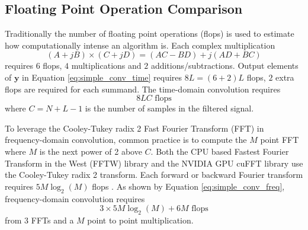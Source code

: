 \subsection{Floating Point Operation Comparison}
Traditionally the number of floating point operations (flops) is used to estimate how computationally intense an algorithm is. 
Each complex multiplication  
\begin{equation}
(A+jB)\times(C+jD) = (AC-BD)+j(AD+BC)
\end{equation}
requires $6$ flops, $4$ multiplications and $2$ additions/subtractions.
Output elements of $\mathbf{y}$ in Equation \eqref{eq:simple_conv_time} requires $8L = (6+2)L$ flops, $2$ extra flops are required for each summand.
The time-domain convolution requires
\begin{equation}
8LC \text{ flops}
\label{eq:flops_time_domain_conv}
\end{equation}
where $C=N+L-1$ is the number of samples in the filtered signal.

To leverage the Cooley-Tukey radix 2 Fast Fourier Transform (FFT) in frequency-domain convolution, common practice is to compute the $M$ point FFT where $M$ is the next power of 2 above $C$.
Both the CPU based Fastest Fourier Transform in the West (FFTW) library and the NVIDIA GPU cuFFT library use the Cooley-Tukey radix 2 transform.
Each forward or backward Fourier transform requires $5M\log_2(M)$ flops \cite{FFTW:2017,cooley1965algorithm}.
As shown by Equation \eqref{eq:simple_conv_freq}, frequency-domain convolution requires 
\begin{equation}
3\times5M\log_2(M)+6M \text{ flops}
\label{eq:flops_freq_domain_conv}
\end{equation}
from $3$ FFTs and a $M$ point to point multiplication.

